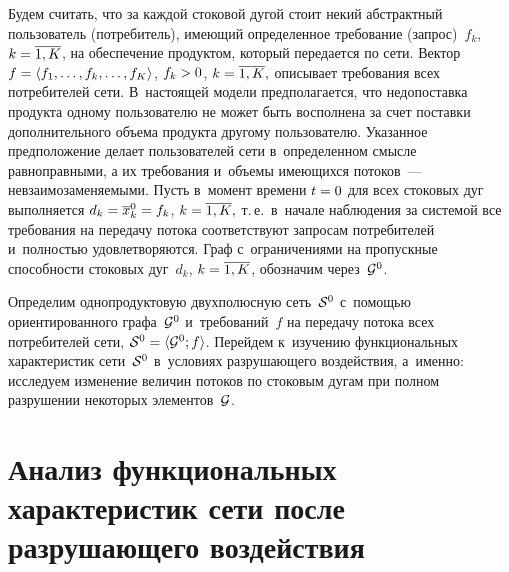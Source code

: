 \begin{multicols}{2}
Будем считать, что за каждой стоковой дугой стоит некий абстрактный пользователь 
(потребитель), имеющий определенное требование (запрос)~$f_k$, $k \hm= \overline{1, K}$, 
на обеспечение продуктом, который передается по сети. Вектор
$ f \hm= \langle f_{1}, \ldots, f_{k}, \ldots, f_{K}\rangle$, $f_{k} \hm> 0$, 
$k \hm= \overline{1, K},$
описывает требования всех потребителей сети.  
В~настоящей модели предполагается, что недопоставка продукта одному 
пользователю не может быть восполнена за счет поставки дополнительного 
объема продукта другому пользователю. Указанное предположение делает 
пользователей сети в~определенном смысле равноправными, а их требования и~объемы 
имеющихся потоков~--- невзаимозаменяемыми.
Пусть в~момент  времени $t\hm = 0$ для всех стоковых дуг выполняется
$d_k \hm=  \overline x_k^0 \hm= f_k$, $k \hm= \overline{1, K},$
т.\,е.\  в~начале наблюдения за системой все требования на передачу 
потока соответствуют запросам потребителей и~полностью удовлетворяются.
Граф с~ограничениями на пропускные способности стоковых дуг~$d_k$, 
$k \hm= \overline{1, K}$, обозначим через~${\cal G}^0$.

Определим однопродуктовую двухполюсную сеть~${\cal S}^0$ с~по\-мощью ориентированного 
графа~${\cal G}^0$ и~требований~$f$ на передачу потока всех потребителей сети,
 ${\cal S}^0 \hm= \langle {\cal G}^0; f \rangle$.
Перейдем к~изучению функциональных характеристик сети~${\cal S}^0$ в~условиях 
разрушающего воздействия, а~именно: исследуем изменение величин потоков по 
стоковым дугам при полном разрушении некоторых элементов~${\cal G}$. 


\section{Анализ функциональных характеристик сети
после разрушающего воздействия}


\end{multicols}
